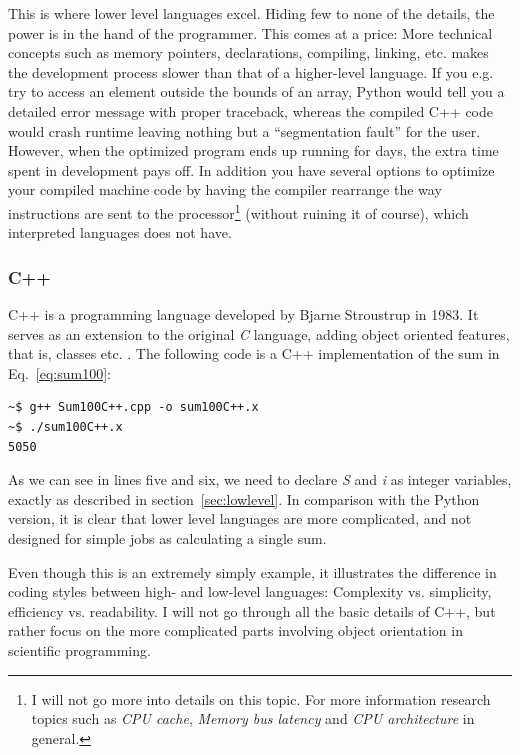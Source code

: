 This is where lower level languages excel. Hiding few to none of the details, the power is in the hand of the programmer. This comes at a price: More technical concepts such as memory pointers, declarations, compiling, linking, etc. makes the development process slower than that of a higher-level language. If you e.g. try to access an element outside the bounds of an array, Python would tell you a detailed error message with proper traceback, whereas the compiled C++ code would crash runtime leaving nothing but a ``segmentation fault'' for the user. However, when the optimized program ends up running for days, the extra time spent in development pays off. In addition you have several options to optimize your compiled machine code by having the compiler rearrange the way instructions are sent to the processor\footnote{I will not go more into details on this topic. For more information research topics such as \textit{CPU cache}, \textit{Memory bus latency} and \textit{CPU architecture} in general.} (without 
ruining it of course), which interpreted languages does not have. 

\subsubsection{C++}

C++ is a programming language developed by Bjarne Stroustrup in 1983. It serves as an extension to the original \textit{C} language, adding object oriented features, that is, classes etc. \cite{ORegan}. The following code is a C++ implementation of the sum in Eq.~\ref{eq:sum100}:

\vspace{0.5 cm}


\begin{verbatim}
~$ g++ Sum100C++.cpp -o sum100C++.x
~$ ./sum100C++.x 
5050
\end{verbatim}


As we can see in lines five and six, we need to declare \textit{S} and \textit{i} as integer variables, exactly as described in section~\ref{sec:lowlevel}. In comparison with the Python version, it is clear that lower level languages are more complicated, and not designed for simple jobs as calculating a single sum.

Even though this is an extremely simply example, it illustrates the difference in coding styles between high- and low-level languages: Complexity vs. simplicity, efficiency vs. readability. I will not go through all the basic details of C++, but rather focus on the more complicated parts involving object orientation in scientific programming.



